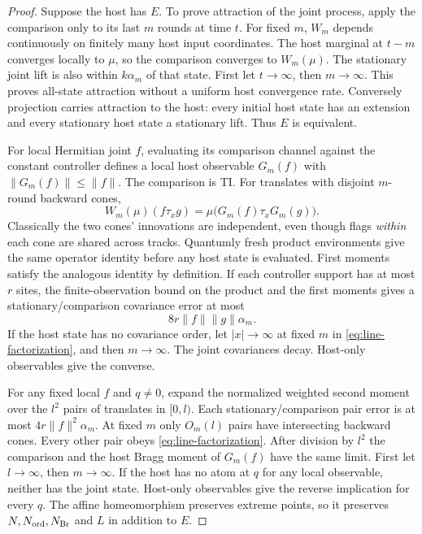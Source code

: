 \begin{proof}
Suppose the host has $E$. To prove attraction of the joint process,
apply the comparison only to its last $m$ rounds at time $t$.
For fixed $m$, $W_m$ depends continuously on finitely many host input
coordinates. The host marginal at $t-m$ converges locally to $\mu$,
so the comparison converges to $W_m(\mu)$. The stationary joint lift
is also within $k\alpha_m$ of that state. First let $t\to\infty$,
then $m\to\infty$. This proves all-state attraction without a uniform
host convergence rate. Conversely projection carries attraction to
the host: every initial host state has an extension and every
stationary host state a stationary lift. Thus $E$ is equivalent.

For local Hermitian joint $f$, evaluating its comparison channel
against the constant controller defines a local host observable
$G_m(f)$ with $\|G_m(f)\|\le\|f\|$. The comparison is TI. For
translates with disjoint $m$-round backward cones,
\begin{equation}\label{eq:line-factorization}
 W_m(\mu)(f\tau_x g)
   =\mu\bigl(G_m(f)\tau_xG_m(g)\bigr).
\end{equation}
Classically the two cones' innovations are independent, even though
flags \emph{within} each cone are shared across tracks. Quantumly
fresh product environments give the same operator identity before
any host state is evaluated. First moments satisfy the analogous
identity by definition. If each controller support has at most $r$
sites, the finite-observation bound on the product and the first
moments gives a stationary/comparison covariance error at most
\[
 8r\|f\|\|g\|\alpha_m.
\]
If the host state has no covariance order, let $|x|\to\infty$ at
fixed $m$ in \eqref{eq:line-factorization}, and then $m\to\infty$.
The joint covariances decay. Host-only observables give the converse.

For any fixed local $f$ and $q\ne0$, expand the normalized weighted
second moment over the $l^2$ pairs of translates in $[0,l)$.
Each stationary/comparison pair error is at most
$4r\|f\|^2\alpha_m$. At fixed $m$ only $O_m(l)$ pairs have intersecting
backward cones. Every other pair obeys
\eqref{eq:line-factorization}. After division by $l^2$ the comparison
and the host Bragg moment of $G_m(f)$ have the same limit.
First let $l\to\infty$, then $m\to\infty$. If the host has no atom
at $q$ for any local observable, neither has the joint state.
Host-only observables give the reverse implication for every $q$.
The affine homeomorphism preserves extreme points, so it preserves
$N,N_{\mathrm{ord}},N_{\mathrm{Br}}$ and $L$ in addition to $E$.
\end{proof}


